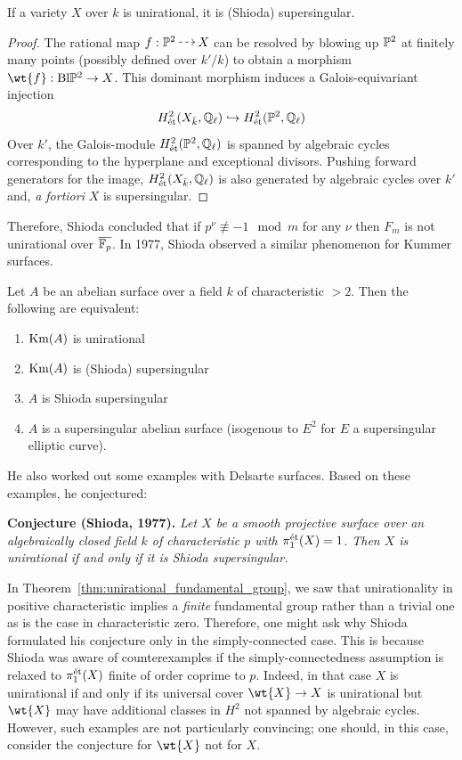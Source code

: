 \documentclass[main.tex]{subfiles}
\begin{document}
\begin{lemma}
If a variety $X$ over $k$ is unirational, it is (Shioda) supersingular. 
\end{lemma}

\begin{proof}
The rational map $f : \P^2 \rat X$ can be resolved by blowing up $\P^2$ at finitely many points (possibly defined over $k'/k$) to obtain a morphism $\wt{f} : \Bl \P^2 \to X$. This dominant morphism induces a Galois-equivariant injection
\[ H^2_{\et}(X_{\bar{k}}, \Q_{\ell}) \embed H^2_{\et}(\P^2, \Q_{\ell}) \]
Over $k'$, the Galois-module $H^2_{\et}(\P^2, \Q_{\ell})$ is spanned by algebraic cycles corresponding to the hyperplane and exceptional divisors. Pushing forward generators for the image, $H^2_{\et}(X_{\bar{k}}, \Q_{\ell})$ is also generated by algebraic cycles over $k'$ and, \textit{a fortiori} $X$ is supersingular.
\end{proof}

Therefore, Shioda concluded that if $p^{\nu} \not\equiv -1 \mod m$ for any $\nu$ then $F_m$ is not unirational over $\ol{\FF_p}$. In 1977, Shioda observed a similar phenomenon for Kummer surfaces.

\begin{theorem}[Shioda, 1977] \cite{shioda:unirational}
Let $A$ be an abelian surface over a field $k$ of characteristic $> 2$. Then the following are equivalent:
\begin{enumerate}
\item $\Km(A)$ is unirational
\item $\Km(A)$ is (Shioda) supersingular
\item $A$ is Shioda supersingular 
\item $A$ is a supersingular abelian surface (isogenous to $E^2$ for $E$ a supersingular elliptic curve).
\end{enumerate}
\end{theorem}

He also worked out some examples with Delsarte surfaces. Based on these examples, he conjectured:

\noindent
\textbf{Conjecture (Shioda, 1977).} \emph{Let $X$ be a smooth projective surface over an algebraically closed field $k$ of characteristic $p$ with $\pi_1^{\et}(X) = 1$. Then $X$ is unirational if and only if it is Shioda supersingular.}

\begin{rmk}
In Theorem~\ref{thm:unirational_fundamental_group}, we saw that unirationality in positive characteristic implies a \textit{finite} fundamental group rather than a trivial one as is the case in characteristic zero. Therefore, one might ask why Shioda formulated his conjecture only in the simply-connected case. This is because Shioda was aware of counterexamples if the simply-connectedness assumption is relaxed to $\pi_1^{\et}(X)$ finite of order coprime to $p$. Indeed, in that case $X$ is unirational if and only if its universal cover $\wt{X} \to X$ is unirational but $\wt{X}$ may have additional classes in $H^2$ not spanned by algebraic cycles. However, such examples are not particularly convincing; one should, in this case, consider the conjecture for $\wt{X}$ not for $X$.  
\end{rmk}
\end{document}
